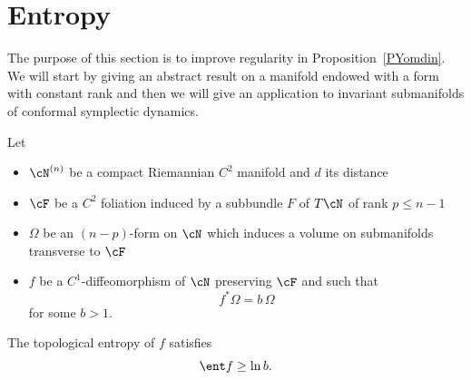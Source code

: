 \section{Entropy}\label{Sentropy}

The purpose of this section is to improve regularity in Proposition~\ref{PYomdin}. We will start by giving an abstract result on a manifold endowed with a form with constant rank and then we will give an application to invariant submanifolds of conformal symplectic dynamics.

Let
\begin{itemize}
\item $\cN^{(n)}$ be a compact Riemannian $C^2$ manifold and $d$ its distance
\item $\cF$ be a $C^2$ foliation induced by a subbundle $F$ of $T\cN$ of rank $p{\leq n-1}$
\item $\Omega$ be an $(n-p)$-form on $\cN$ which induces a volume on submanifolds transverse to $\cF$
\item $f$ be a $C^1$-diffeomorphism of $\cN$ preserving $\cF$ and such that
\[
f^*\Omega = b \, \Omega
\]
for some $b>1$.
\end{itemize}

\begin{theorem}
\label{thm:ent}
The topological entropy of $f$ satisfies
\[
\ent f \geq \ln b.
\]
\end{theorem}

